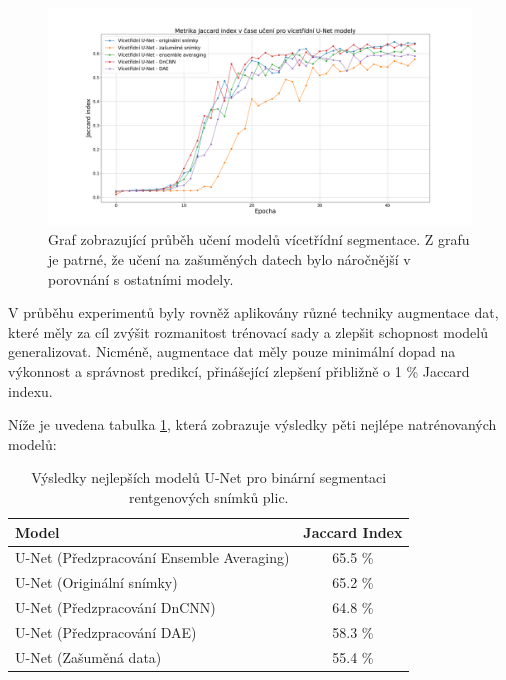 \documentclass[male,czech,api_ing]{thesis}
\begin{document}
\begin{figure}[h]
    \centering
    \includegraphics[width=\linewidth]{Prilohy/Obrazky/Jaccard_index_multiclass_unet.png}
    \caption{Graf zobrazující průběh učení modelů vícetřídní segmentace. Z grafu je patrné, že učení na zašuměných datech bylo náročnější v porovnání s ostatními modely.}
    \label{fig:MulticlassUnet_plot}
\end{figure}

V průběhu experimentů byly rovněž aplikovány různé techniky augmentace dat, které měly za cíl zvýšit rozmanitost trénovací sady a zlepšit schopnost modelů generalizovat. Nicméně, augmentace dat měly pouze minimální dopad na výkonnost a správnost predikcí, přinášející zlepšení přibližně o 1 \% Jaccard indexu.

Níže je uvedena tabulka \ref{tab:MulticlassUnetResults}, která zobrazuje výsledky pěti nejlépe natrénovaných modelů:

\begin{table}[h]
    \centering
    \begin{tabular}{|l|c|}
        \hline
        \textbf{Model}                            & \textbf{Jaccard Index} \\ \hline
        U-Net (Předzpracování Ensemble Averaging) & 65.5 \%                 \\ \hline
        U-Net (Originální snímky)                 & 65.2 \%                 \\ \hline
        U-Net (Předzpracování DnCNN)              & 64.8 \%                 \\ \hline
        U-Net (Předzpracování DAE)                & 58.3 \%                 \\ \hline
        U-Net (Zašuměná data)                     & 55.4 \%                 \\ \hline
    \end{tabular}
    \caption{Výsledky nejlepších modelů U-Net pro binární segmentaci rentgenových snímků plic.}
    \label{tab:MulticlassUnetResults}
\end{table}
\end{document}
